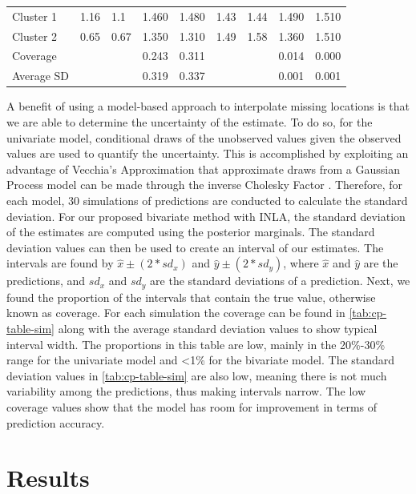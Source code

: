 \documentclass[12pt]{article}
\begin{document}
\begin{table}
\begin{tabular}[t]{lllrrllrr}
\hspace{1em}Cluster 1 & 1.16 & 1.1 & 1.460 & 1.480 & 1.43 & 1.44 & 1.490 & 1.510\\
\hspace{1em}Cluster 2 & 0.65 & 0.67 & 1.350 & 1.310 & 1.49 & 1.58 & 1.360 & 1.510\\
\hspace{1em}Coverage &  &  & 0.243 & 0.311 &  &  & 0.014 & 0.000\\
\hspace{1em}Average SD &  &  & 0.319 & 0.337 &  &  & 0.001 & 0.001\\
\bottomrule
\end{tabular}
\end{table}

A benefit of using a model-based approach to interpolate missing
locations is that we are able to determine the uncertainty of the
estimate. To do so, for the univariate model, conditional draws of the
unobserved values given the observed values are used to quantify the
uncertainty. This is accomplished by exploiting an advantage of
Vecchia's Approximation that approximate draws from a Gaussian Process
model can be made through the inverse Cholesky Factor
\citep{guinness_permutation_2018}. Therefore, for each model, 30
simulations of predictions are conducted to calculate the standard
deviation. For our proposed bivariate method with INLA, the standard
deviation of the estimates are computed using the posterior marginals.
The standard deviation values can then be used to create an interval of
our estimates. The intervals are found by \(\hat{x} \pm (2*sd_x)\) and
\(\hat{y} \pm (2*sd_y)\), where \(\hat{x}\) and \(\hat{y}\) are the
predictions, and \(sd_x\) and \(sd_y\) are the standard deviations of a
prediction. Next, we found the proportion of the intervals that contain
the true value, otherwise known as coverage. For each simulation the
coverage can be found in \cref{tab:cp-table-sim} along with the average
standard deviation values to show typical interval width. The
proportions in this table are low, mainly in the 20\%-30\% range for the
univariate model and \textless1\% for the bivariate model. The standard
deviation values in \cref{tab:cp-table-sim} are also low, meaning there
is not much variability among the predictions, thus making intervals
narrow. The low coverage values show that the model has room for
improvement in terms of prediction accuracy.

\hypertarget{results}{%
\section{Results}\label{results}}
\end{document}

